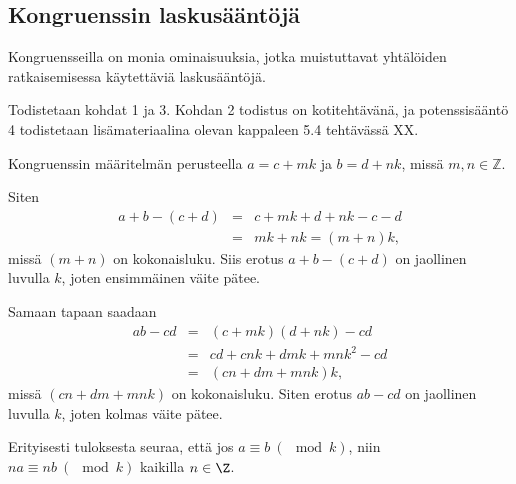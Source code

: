 \subsection*{Kongruenssin laskusääntöjä} Kongruensseilla on monia ominaisuuksia, jotka muistuttavat yhtälöiden ratkaisemisessa käytettäviä laskusääntöjä.


\begin{todistus}
Todistetaan kohdat 1 ja 3. Kohdan 2 todistus on kotitehtävänä, ja potenssisääntö 4 todistetaan lisämateriaalina olevan kappaleen 5.4 tehtävässä XX.

Kongruenssin määritelmän perusteella $a=c + mk$ ja $b= d + nk$, missä $m,n\in \mathbb{Z}$.

Siten
\begin{eqnarray*}
a+b - (c+d) &=& c + mk + d + nk - c - d\\ &=& mk + nk = (m+n)k,
\end{eqnarray*}
missä $(m+n)$ on kokonaisluku. Siis erotus $a + b - (c+d)$ on jaollinen luvulla $k$, joten ensimmäinen väite pätee.

Samaan tapaan saadaan
\begin{eqnarray*}
ab - cd &=& (c + mk)(d + nk) - cd\\ &=& cd +c nk + d mk + mnk^2 - cd\\ &=& (cn+dm+mnk)k,
\end{eqnarray*}
missä $(cn+dm+mnk)$ on kokonaisluku. Siten erotus $ab - cd$ on jaollinen luvulla $k$, joten kolmas väite pätee.
\end{todistus}


Erityisesti tuloksesta seuraa, että  jos $a\equiv b \ (\mod k)$, niin $na\equiv nb
\ (\mod k)$ kaikilla $n\in \Z$.


